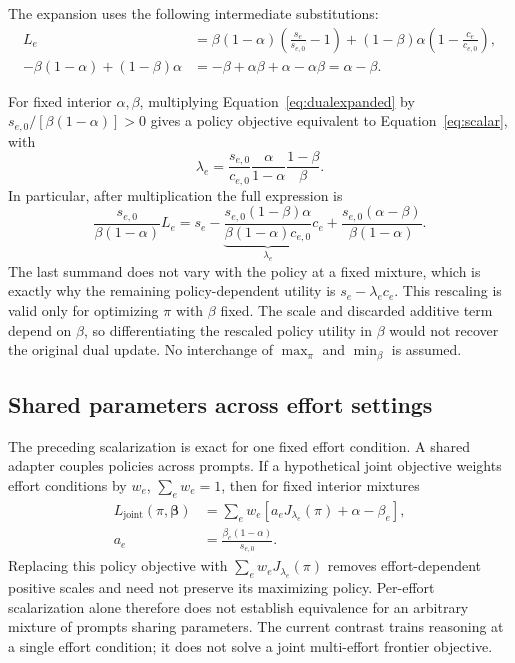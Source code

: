 \documentclass[11pt]{article}
\begin{document}
The expansion uses the following intermediate substitutions:
\begin{align}
 L_e&=\beta(1-\alpha)\left(\frac{s_e}{s_{e,0}}-1\right)
       +(1-\beta)\alpha\left(1-\frac{c_e}{c_{e,0}}\right),\\
 -\beta(1-\alpha)+(1-\beta)\alpha
   &=-\beta+\alpha\beta+\alpha-\alpha\beta=\alpha-\beta.
\end{align}

For fixed interior $\alpha,\beta$, multiplying Equation~\eqref{eq:dualexpanded} by $s_{e,0}/[\beta(1-\alpha)]>0$ gives a policy objective equivalent to Equation~\eqref{eq:scalar}, with
\begin{equation}
 \boxed{\lambda_e=\frac{s_{e,0}}{c_{e,0}}
              \frac{\alpha}{1-\alpha}\frac{1-\beta}{\beta}.}
 \label{eq:lambdabeta}
\end{equation}
In particular, after multiplication the full expression is
\begin{equation}
 \frac{s_{e,0}}{\beta(1-\alpha)}L_e
 =s_e-\underbrace{\frac{s_{e,0}(1-\beta)\alpha}
                        {\beta(1-\alpha)c_{e,0}}}_{\lambda_e}c_e
       +\frac{s_{e,0}(\alpha-\beta)}{\beta(1-\alpha)}.
\end{equation}
The last summand does not vary with the policy at a fixed mixture, which is exactly why the remaining policy-dependent utility is $s_e-\lambda_e c_e$.
This rescaling is valid only for optimizing $\pi$ with $\beta$ fixed. The scale and discarded additive term depend on $\beta$, so differentiating the rescaled policy utility in $\beta$ would not recover the original dual update. No interchange of $\max_\pi$ and $\min_\beta$ is assumed.

\subsection{Shared parameters across effort settings}

The preceding scalarization is exact for one fixed effort condition. A shared adapter couples policies across prompts. If a hypothetical joint objective weights effort conditions by $w_e$, $\sum_e w_e=1$, then for fixed interior mixtures
\begin{align}
 L_{\mathrm{joint}}(\pi,\boldsymbol\beta)
 &=\sum_e w_e\left[a_eJ_{\lambda_e}(\pi)+\alpha-\beta_e\right],\\
 a_e&=\frac{\beta_e(1-\alpha)}{s_{e,0}}.
\end{align}
Replacing this policy objective with $\sum_e w_eJ_{\lambda_e}(\pi)$ removes effort-dependent positive scales and need not preserve its maximizing policy. Per-effort scalarization alone therefore does not establish equivalence for an arbitrary mixture of prompts sharing parameters. The current contrast trains reasoning at a single effort condition; it does not solve a joint multi-effort frontier objective.
\end{document}
